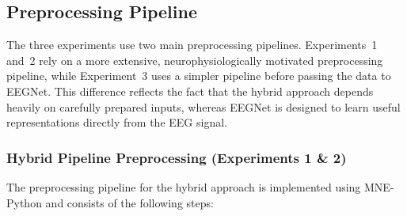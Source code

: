 \documentclass[11pt,a4paper]{article}
\begin{document}
	\subsection{Preprocessing Pipeline}
	\label{sec:preproc}
	
	The three experiments use two main preprocessing pipelines. Experiments~1 and~2 rely on a more
	extensive, neurophysiologically motivated preprocessing pipeline, while Experiment~3 uses a simpler
	pipeline before passing the data to EEGNet. This difference reflects the fact that the hybrid approach
	depends heavily on carefully prepared inputs, whereas EEGNet is designed to learn useful
	representations directly from the EEG signal.
	
	\subsubsection{Hybrid Pipeline Preprocessing (Experiments 1 \& 2)}
	
	The preprocessing pipeline for the hybrid approach is implemented using MNE-Python
	\cite{gramfort2013mne} and consists of the following steps:
	
\end{document}
